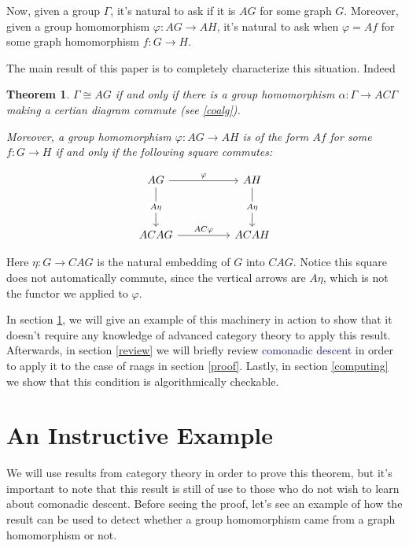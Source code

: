 \documentclass[12pt]{article}
\newtheorem{thm}{Theorem}
\theoremstyle{definition}
\theoremstyle{theorem}
\newcommand*{\important}[1]{\textcolor{MidnightBlue}{#1}}
\begin{document}
  Now, given a group $\Gamma$, it's natural to ask if it is $AG$ for some 
  graph $G$. Moreover, given a group homomorphism $\varphi : AG \to AH$, it's 
  natural to ask when $\varphi = Af$ for some graph homomorphism $f : G \to H$.

  The main result of this paper is to completely characterize this situation.
  Indeed

  \begin{thm}
      $\Gamma \cong AG$ if and only if there is a group homomorphism 
      $\alpha : \Gamma \to AC\Gamma$ making a certian diagram 
      commute (see \ref{coalg}).

      Moreover, a group homomorphism $\varphi : AG \to AH$ is of the form
      $Af$ for some $f : G \to H$ if and only if the following square commutes:

      \[
          \begin{tikzcd}
          AG && AH \\
          \\
          ACAG && ACAH
          \arrow["\varphi", from=1-1, to=1-3]
          \arrow["AC\varphi", from=3-1, to=3-3]
          \arrow["{A \eta}"{description}, from=1-1, to=3-1]
          \arrow["A\eta"{description}, from=1-3, to=3-3]
          \end{tikzcd}
      \]
  \end{thm}

  Here $\eta : G \to CAG$ is the natural embedding of $G$ into $CAG$.
  Notice this square does not automatically commute, since the vertical
  arrows are $A \eta$, which is not the functor we applied to $\varphi$.

  In section \ref{eg}, we will give an example of this machinery in action
  to show that it doesn't require any knowledge of advanced category theory
  to apply this result. Afterwards, in section \ref{review} 
  we will briefly review \important{comonadic descent} in order to apply it
  to the case of raags in section \ref{proof}. Lastly, in section \ref{computing}
  we show that this condition is algorithmically checkable. 




\section{An Instructive Example}
\label{eg}

We will use results from category theory in order to prove this theorem,
but it's important to note that this result is still of use to those who 
do not wish to learn about comonadic descent. Before seeing the proof,
let's see an example of how the result can be used to detect whether a group 
homomorphism came from a graph homomorphism or not.
\end{document}
